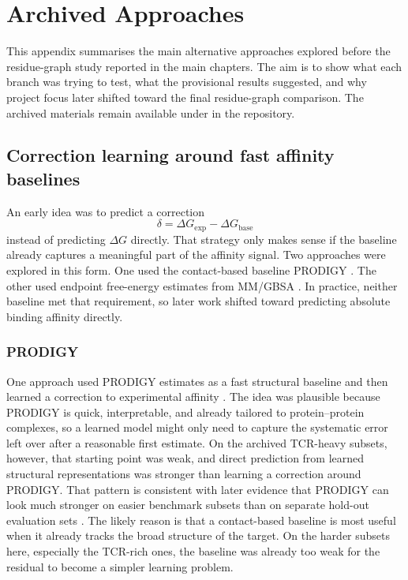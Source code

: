 \chapter{Archived Approaches}
\label{ch:appendix_archive}

This appendix summarises the main alternative approaches explored before the residue-graph study reported in the main chapters. The aim is to show what each branch was trying to test, what the provisional results suggested, and why project focus later shifted toward the final residue-graph comparison. The archived materials remain available under  in the repository.

\section{Correction learning around fast affinity baselines}

An early idea was to predict a correction
\[
\delta = \Delta G_{\mathrm{exp}} - \Delta G_{\mathrm{base}}
\]
instead of predicting $\Delta G$ directly. That strategy only makes sense if the baseline already captures a meaningful part of the affinity signal. Two approaches were explored in this form. One used the contact-based baseline PRODIGY \citep{Vangone2015Contacts}. The other used endpoint free-energy estimates from MM/GBSA \citep{Massova2000MMPBSA}. In practice, neither baseline met that requirement, so later work shifted toward predicting absolute binding affinity directly.

\subsection{PRODIGY}

One approach used PRODIGY estimates as a fast structural baseline and then learned a correction to experimental affinity \citep{Vangone2015Contacts}. The idea was plausible because PRODIGY is quick, interpretable, and already tailored to protein--protein complexes, so a learned model might only need to capture the systematic error left over after a reasonable first estimate. On the archived TCR-heavy subsets, however, that starting point was weak, and direct prediction from learned structural representations was stronger than learning a correction around PRODIGY. That pattern is consistent with later evidence that PRODIGY can look much stronger on easier benchmark subsets than on separate hold-out evaluation sets \citep{RomeroMolina2022PPIAffinity}. The likely reason is that a contact-based baseline is most useful when it already tracks the broad structure of the target. On the harder subsets here, especially the TCR-rich ones, the baseline was already too weak for the residual to become a simpler learning problem.

